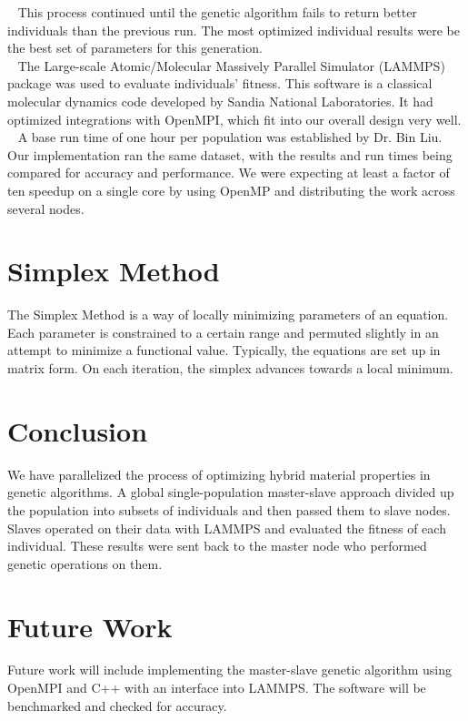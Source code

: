 \documentclass[letterpaper, 12pt]{article}
\begin{document}
\begin{flushleft}
~\newline 
This process continued until the genetic algorithm fails to return better individuals than the previous run.  %
The most optimized individual results were be the best set of parameters for this generation. \\
~\newline
The Large-scale Atomic/Molecular Massively Parallel Simulator (LAMMPS) package was used to evaluate individuals' fitness.  This software is a classical molecular dynamics code developed by Sandia National Laboratories.  It had optimized integrations with OpenMPI, which fit into our overall design very well. \\
~\newline 
A base run time of one hour per population was established by Dr. Bin Liu.  Our implementation ran the same dataset, with the results and run times being compared for accuracy and performance.  We were expecting at least a factor of ten speedup on a single core by using OpenMP and distributing the work across several nodes.\\


\section*{Simplex Method}
The Simplex Method is a way of locally minimizing parameters of an equation.  Each parameter is constrained to a certain range and permuted slightly in an attempt to minimize a functional value.  Typically, the equations are set up in matrix form.  On each iteration, the simplex advances towards a local minimum. 

\newpage
\section*{Conclusion}
We have parallelized the process of optimizing hybrid material properties in genetic algorithms.  A global single-population master-slave approach  divided up the population into subsets of individuals and then passed them to slave nodes.  Slaves operated on their data with LAMMPS and evaluated the fitness of each individual.  These results were sent back to the master node who performed genetic operations on them.


\section*{Future Work}
Future work will include implementing the master-slave genetic algorithm using OpenMPI and C++ with an interface into LAMMPS.  The software will be benchmarked and checked for accuracy.
\newpage
\printbibliography

\end{flushleft}
\end{document}
